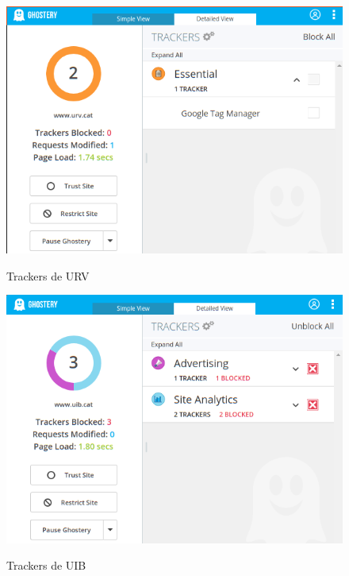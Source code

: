 \documentclass[10pt,a4paper]{article}
\begin{document}
\begin{figure}[H]
  \centering
  \includegraphics[scale=0.6]{ghost_urv.png}\\
  \caption{Trackers de URV}
  \label{fig:object}
\end{figure}

\begin{figure}[H]
  \centering
  \includegraphics[scale=0.6]{ghost_uib.png}\\
  \caption{Trackers de UIB}
  \label{fig:object}
\end{figure}
\end{document}
